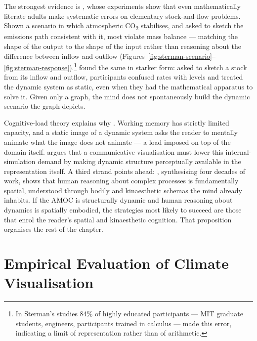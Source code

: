 The strongest evidence is \citet{sterman2008}, whose experiments show that even mathematically literate adults make systematic errors on elementary stock-and-flow problems. Shown a scenario in which atmospheric CO\textsubscript{2} stabilises, and asked to sketch the emissions path consistent with it, most violate mass balance --- matching the shape of the output to the shape of the input rather than reasoning about the difference between inflow and outflow (Figures~\ref{fig:sterman-scenario}--\ref{fig:sterman-response}).\footnote{In Sterman's studies 84\% of highly educated participants --- MIT graduate students, engineers, participants trained in calculus --- made this error, indicating a limit of representation rather than of arithmetic.} \citet{cronin2009} found the same in starker form: asked to sketch a stock from its inflow and outflow, participants confused rates with levels and treated the dynamic system as static, even when they had the mathematical apparatus to solve it. Given only a graph, the mind does not spontaneously build the dynamic scenario the graph depicts.



Cognitive-load theory explains why \citep{sweller1988, swellervanmerrienboer2019}. Working memory has strictly limited capacity, and a static image of a dynamic system asks the reader to mentally animate what the image does not animate --- a load imposed on top of the domain itself. \citet{ware2021} argues that a communicative visualisation must lower this internal-simulation demand by making dynamic structure perceptually available in the representation itself. A third strand points ahead: \citet{tversky2019}, synthesising four decades of work, shows that human reasoning about complex processes is fundamentally spatial, understood through bodily and kinaesthetic schemas the mind already inhabits. If the AMOC is structurally dynamic and human reasoning about dynamics is spatially embodied, the strategies most likely to succeed are those that enrol the reader's spatial and kinaesthetic cognition. That proposition organises the rest of the chapter.

\section{Empirical Evaluation of Climate Visualisation}
\label{sec:empirical-viz}

